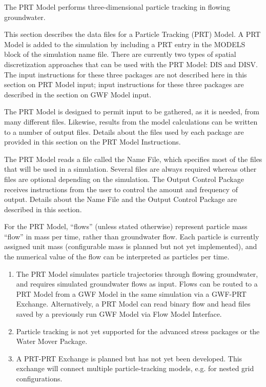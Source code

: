 The PRT Model performs three-dimensional particle tracking in flowing groundwater.

This section describes the data files for a \mf Particle Tracking (PRT) Model.  A PRT Model is added to the simulation by including a PRT entry in the MODELS block of the simulation name file.  There are currently two types of spatial discretization approaches that can be used with the PRT Model: DIS and DISV.  The input instructions for these three packages are not described here in this section on PRT Model input; input instructions for these three packages are described in the section on GWF Model input.

The PRT Model is designed to permit input to be gathered, as it is needed, from many different files.  Likewise, results from the model calculations can be written to a number of output files. Details about the files used by each package are provided in this section on the PRT Model Instructions.

The PRT Model reads a file called the Name File, which specifies most of the files that will be used in a simulation. Several files are always required whereas other files are optional depending on the simulation. The Output Control Package receives instructions from the user to control the amount and frequency of output.  Details about the Name File and the Output Control Package are described in this section.

For the PRT Model, ``flows'' (unless stated otherwise) represent particle mass ``flow'' in mass per time, rather than groundwater flow.  Each particle is currently assigned unit mass (configurable mass is planned but not yet implemented), and the numerical value of the flow can be interpreted as particles per time.

\begin{enumerate}

\item The PRT Model simulates particle trajectories through flowing groundwater, and requires simulated groundwater flows as input. Flows can be routed to a PRT Model from a GWF Model in the same simulation via a GWF-PRT Exchange.  Alternatively, a PRT Model can read binary flow and head files saved by a previously run GWF Model via Flow Model Interface.

\item Particle tracking is not yet supported for the advanced stress packages or the Water Mover Package.

\item A PRT-PRT Exchange is planned but has not yet been developed. This exchange will connect multiple particle-tracking models, e.g. for nested grid configurations.

\end{enumerate}


